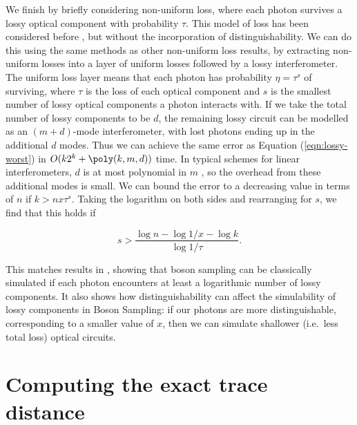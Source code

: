 We finish by briefly considering non-uniform loss, where each photon survives a lossy optical component with probability $\tau$. 
This model of loss has been considered before \cite{garciapatron2017,oszmaniec2018}, but without the incorporation of distinguishability. We can do this using the same methods as other non-uniform loss results, by extracting non-uniform losses into a layer of uniform losses followed by a lossy interferometer. 
The uniform loss layer means that each photon has probability $\eta=\tau^s$ of surviving, where $\tau$ is the loss of each optical component and $s$ is the smallest number of lossy optical components a photon interacts with. 
If we take the total number of lossy components to be $d$, the remaining lossy circuit can be modelled as an $(m+d)$-mode interferometer, with lost photons ending up in the additional $d$ modes. 
Thus we can achieve the same error as Equation (\ref{eqn:lossy-worst}) in $O(k2^k+\poly(k,m,d))$ time. 
In typical schemes for linear interferometers, $d$ is at most polynomial in $m$ \cite{reck1994,clements2016}, so the overhead from these additional modes is small. 
We can bound the error to a decreasing value in terms of $n$ if $k>nx\tau^s$. Taking the logarithm on both sides and rearranging for $s$, we find that this holds if

\begin{equation}
s>\frac{\log n-\log 1/x-\log k}{\log1/\tau}.
\end{equation}

This matches results in \cite{garciapatron2017,oszmaniec2018}, showing that boson sampling can be classically simulated if each photon encounters at least a logarithmic number of lossy components. 
It also shows how distinguishability can affect the simulability of lossy components in Boson Sampling: if our photons are more distinguishable, corresponding to a smaller value of $x$, then we can simulate shallower (i.e.\ less total loss) optical circuits.

\section{Computing the exact trace distance}

